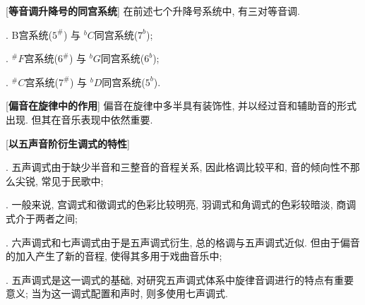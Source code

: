 [\textbf{等音调升降号的同宫系统}] 在前述七个升降号系统中, 有三对等音调.\par
{}. B宫系统($5^\#$) 与 $^bC$同宫系统($7^b$);\par
{}. $^\#F$宫系统($6^\#$) 与 $^bG$同宫系统($6^b$);\par
{}. $^\#C$宫系统($7^\#$) 与 $^bD$同宫系统($5^b$).\par

[\textbf{偏音在旋律中的作用}] 偏音在旋律中多半具有装饰性, 并以经过音和辅助音的形式出现. 但其在音乐表现中依然重要.\par

\clearpage

[\textbf{以五声音阶衍生调式的特性}] \par
{}. 五声调式由于缺少半音和三整音的音程关系, 因此格调比较平和, 音的倾向性不那么尖锐, 常见于民歌中;\par
{}. 一般来说, 宫调式和徵调式的色彩比较明亮, 羽调式和角调式的色彩较暗淡, 商调式介于两者之间;\par
{}. 六声调式和七声调式由于是五声调式衍生, 总的格调与五声调式近似. 但由于偏音的加入产生了新的音程, 使得其多用于戏曲音乐中;\par
{}. 五声调式是这一调式的基础, 对研究五声调式体系中旋律音调进行的特点有重要意义; 当为这一调式配置和声时, 则多使用七声调式.\par


